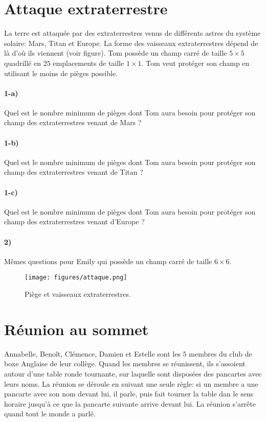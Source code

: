 \documentclass[a4paper,10pt,oneside]{article}
\begin{document}
\clearpage
\section{Attaque extraterrestre}

La terre est attaquée par des extraterrestres venus de différents astres du système solaire: Mars, Titan et Europe.
La forme des vaisseaux extraterrestres dépend de là d'où ils viennent (voir figure).
Tom possède un champ carré de taille $5\times 5$ quadrillé en $25$ emplacements de taille $1\times 1$.
Tom veut protéger son champ en utilisant le moins de pièges possible.

\paragraph*{1-a)}
Quel est le nombre minimum de pièges dont Tom aura besoin pour protéger son champ des extraterrestres venant de Mars ?

\paragraph*{1-b)}
Quel est le nombre minimum de pièges dont Tom aura besoin pour protéger son champ des extraterrestres venant de Titan ?

\paragraph*{1-c)}
Quel est le nombre minimum de pièges dont Tom aura besoin pour protéger son champ des extraterrestres venant d'Europe ?

\paragraph*{2)}
Mêmes questions pour Emily qui possède un champ carré de taille $6\times 6$.


\vspace{3cm}
\begin{figure}[!ht]
  \centering
  \texttt{[image: figures/attaque.png]}
  \caption*{Piège et vaisseaux extraterrestres.}
\end{figure}


\clearpage
\section{Réunion au sommet}

Annabelle, Benoît, Clémence, Damien et Estelle sont les $5$ membres du club de boxe Anglaise de leur collège.
Quand les membres se réunissent, ils s'assoient autour d'une table ronde tournante, sur laquelle sont disposées des pancartes avec leurs noms.
La réunion se déroule en suivant une seule règle: si un membre a une pancarte avec son nom devant lui, il parle, puis fait tourner la table dan le sens horaire jusqu'à ce que la pancarte suivante arrive devant lui.
La réunion s'arrête quand tout le monde a parlé.
\end{document}
